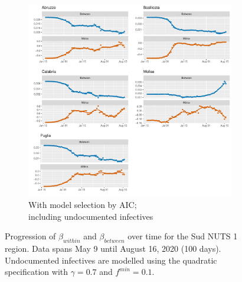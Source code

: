 \documentclass[12pt]{article}
\begin{document}
\begin{appendices}
\begin{figure}[H]
\begin{subfigure}{\textwidth}
    	      \includegraphics[width=\linewidth]{output/model_between_lag14_betas_Sud_aic_UndocQuadratic_rolling.pdf}
    	      \caption{With model selection by AIC; \\ including undocumented infectives}
    	      \label{fig:beta_between_over_time_sud_aic_undoc}
    	    \end{subfigure}
    	    \caption{Progression of $\beta_{within}$ and $\beta_{between}$ over time for the Sud NUTS 1 region. Data spans May 9 until August 16, 2020 (100 days). Undocumented infectives are modelled using the quadratic specification with $\gamma = 0.7$ and $f^{min}=0.1$.}
    	    \label{fig:beta_between_over_time_sud}
        \end{figure}
		

\end{appendices}
\end{document}
